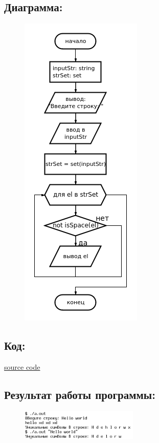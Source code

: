 \documentclass[14pt,a4paper]{article}
\begin{document}
\subsection{Диаграмма:}
\begin{figure}[H]
  \centering
  \includegraphics[height=0.4\textheight]{data/diagram19_1.png}
\end{figure}
\subsection{Код:}

\href{https://raw.githubusercontent.com/John1400800/stuff/refs/heads/main/c_learning/home_works/task19_1.cpp}{source code}
\subsection{Результат работы программы:}
\begin{figure}[H]
  \includegraphics[width=0.5\textwidth]{data/demo19_1.png}
\end{figure}
\end{document}
